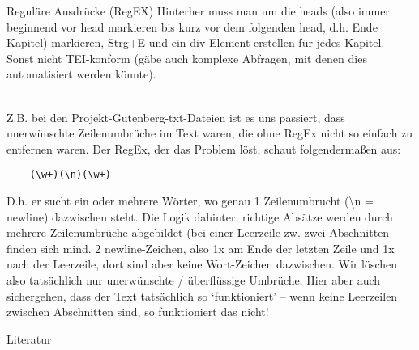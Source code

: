 \begin{frame}{Reguläre Ausdrücke (RegEX)}
Hinterher muss man um die heads (also immer beginnend vor head markieren bis kurz vor dem folgenden head, d.h. Ende Kapitel) markieren, Strg+E und ein div-Element erstellen für jedes Kapitel. Sonst nicht TEI-konform (gäbe auch komplexe Abfragen, mit denen dies automatisiert werden könnte).
\medskip

\\
Z.B. bei den Projekt-Gutenberg-txt-Dateien ist es uns passiert, dass unerwünschte Zeilenumbrüche im Text waren, die ohne RegEx nicht so einfach zu entfernen waren. Der RegEx, der das Problem löst, schaut folgendermaßen aus:
\begin{verbatim}
    (\w+)(\n)(\w+)
\end{verbatim}
D.h. er sucht ein oder mehrere Wörter, wo genau 1 Zeilenumbrucht (\textbackslash n = newline) dazwischen steht. Die Logik dahinter: richtige Absätze werden durch mehrere Zeilenumbrüche abgebildet (bei einer Leerzeile zw. zwei Abschnitten finden sich mind. 2 newline-Zeichen, also 1x am Ende der letzten Zeile und 1x nach der Leerzeile, dort sind aber keine Wort-Zeichen dazwischen. Wir löschen also tatsächlich nur unerwünschte / überflüssige  Umbrüche. Hier aber auch sichergehen, dass der Text tatsächlich so `funktioniert' -- wenn keine Leerzeilen zwischen Abschnitten sind, so funktioniert das nicht!

\end{frame}



\begin{frame}[allowframebreaks]{Literatur}

\AtNextBibliography{\footnotesize}
\printbibliography  
\end{frame}

